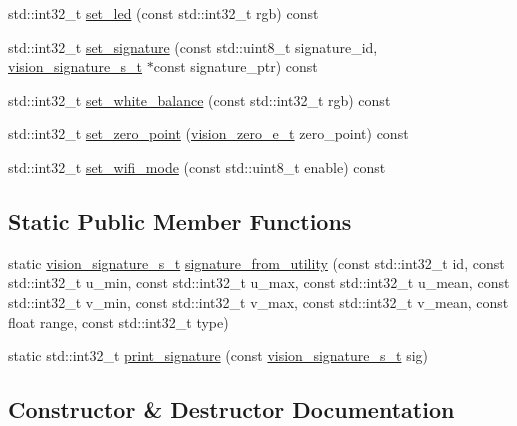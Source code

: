 \begin{DoxyCompactItemize}
\item 
std\+::int32\+\_\+t \hyperlink{classpros_1_1Vision_ada3f1fdd2cc24c15af26bdd7c17bf604}{set\+\_\+led} (const std\+::int32\+\_\+t rgb) const
\item 
std\+::int32\+\_\+t \hyperlink{classpros_1_1Vision_a71c3c083ad5538a544e377ebc510cb75}{set\+\_\+signature} (const std\+::uint8\+\_\+t signature\+\_\+id, \hyperlink{vision_8h_a135c729c7277f6cc019c2924088a5fd5}{vision\+\_\+signature\+\_\+s\+\_\+t} $\ast$const signature\+\_\+ptr) const
\item 
std\+::int32\+\_\+t \hyperlink{classpros_1_1Vision_a923fc18c2b50a42b9c5c6292a476c9b5}{set\+\_\+white\+\_\+balance} (const std\+::int32\+\_\+t rgb) const
\item 
std\+::int32\+\_\+t \hyperlink{classpros_1_1Vision_a89e0a23b112b8632171ef27cc6f57a6c}{set\+\_\+zero\+\_\+point} (\hyperlink{vision_8h_a2e8bc1c48f8aab12275bfc1868fbbad6}{vision\+\_\+zero\+\_\+e\+\_\+t} zero\+\_\+point) const
\item 
std\+::int32\+\_\+t \hyperlink{classpros_1_1Vision_aa41af827ad6f9d6c050ca28c51d173ad}{set\+\_\+wifi\+\_\+mode} (const std\+::uint8\+\_\+t enable) const
\end{DoxyCompactItemize}
\subsection*{Static Public Member Functions}
\begin{DoxyCompactItemize}
\item 
static \hyperlink{vision_8h_a135c729c7277f6cc019c2924088a5fd5}{vision\+\_\+signature\+\_\+s\+\_\+t} \hyperlink{classpros_1_1Vision_aa46f3bfb4956c7061b34764c92fc68fd}{signature\+\_\+from\+\_\+utility} (const std\+::int32\+\_\+t id, const std\+::int32\+\_\+t u\+\_\+min, const std\+::int32\+\_\+t u\+\_\+max, const std\+::int32\+\_\+t u\+\_\+mean, const std\+::int32\+\_\+t v\+\_\+min, const std\+::int32\+\_\+t v\+\_\+max, const std\+::int32\+\_\+t v\+\_\+mean, const float range, const std\+::int32\+\_\+t type)
\item 
static std\+::int32\+\_\+t \hyperlink{classpros_1_1Vision_ada22311366ce088fa9ac08a8e3510800}{print\+\_\+signature} (const \hyperlink{vision_8h_a135c729c7277f6cc019c2924088a5fd5}{vision\+\_\+signature\+\_\+s\+\_\+t} sig)
\end{DoxyCompactItemize}


\subsection{Constructor \& Destructor Documentation}
\mbox{\label{classpros_1_1Vision_a46cdaf74713f630b5bb5f4d0d3259dcd}} 
